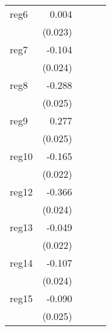 {\begin{longtable}{l*{4}{D{.}{.}{-1}}}
\addlinespace
reg6        &       0.004         &                     &                     &                     \\
            &     (0.023)         &                     &                     &                     \\
\addlinespace
reg7        &      -0.104\sym{***}&                     &                     &                     \\
            &     (0.024)         &                     &                     &                     \\
\addlinespace
reg8        &      -0.288\sym{***}&                     &                     &                     \\
            &     (0.025)         &                     &                     &                     \\
\addlinespace
reg9        &       0.277\sym{***}&                     &                     &                     \\
            &     (0.025)         &                     &                     &                     \\
\addlinespace
reg10       &      -0.165\sym{***}&                     &                     &                     \\
            &     (0.022)         &                     &                     &                     \\
\addlinespace
reg12       &      -0.366\sym{***}&                     &                     &                     \\
            &     (0.024)         &                     &                     &                     \\
\addlinespace
reg13       &      -0.049\sym{*}  &                     &                     &                     \\
            &     (0.022)         &                     &                     &                     \\
\addlinespace
reg14       &      -0.107\sym{***}&                     &                     &                     \\
            &     (0.024)         &                     &                     &                     \\
\addlinespace
reg15       &      -0.090\sym{***}&                     &                     &                     \\
            &     (0.025)         &                     &                     &                     \\

\end{longtable}}
